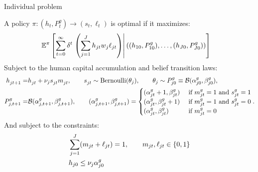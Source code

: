 
\begin{frame}{Individual problem}


A policy $\pi: (h_t, P_t^g) \to (s_t, \ell_t)$ is optimal if it maximizes:
\begin{align*}
& \mathbb{E}^\pi \left[ 
   \sum_{t=0}^\infty \delta^t 
   \left. \left( \sum_{j=1}^J h_{jt} w_j \ell_{jt}  \right) \right\vert
   \left( (h_{10}, P_{10}^g), \dots, (h_{J0}, P_{J0}^g) \right)
 \right] 
\end{align*}
Subject to the human capital accumulation and belief transition laws:
\begin{align*}
    h_{jt+1}^{} =& h_{jt}^{} + \nu_j s_{jt}^{}  m_{jt}^{}, 
    \quad \quad 
    s_{jt}^{} \sim \text{Bernoulli} (\theta_j), 
    \quad \quad
    \theta_{j} \sim P_{j0}^{g} \equiv \mathcal{B} (\alpha_{j0}^g, \beta_{j0}^g),
    \\
    P_{j,t+1}^g =& \mathcal{B} (\alpha_{j,t+1}^g, \beta_{j,t+1}^g), 
    \quad \quad 
    (\alpha_{j,t+1}^{g}, \beta_{j,t+1}^{g}) = 
    \begin{cases} 
        (\alpha_{jt}^g + 1, \beta_{jt}^g) &\text{ if } m_{jt}^g = 1 \text{ and } s_{jt}^g = 1 \\
        (\alpha_{jt}^g, \beta_{jt}^g + 1) &\text{ if } m_{jt}^g = 1 \text{ and } s_{jt}^g = 0 \\
        (\alpha_{jt}^g, \beta_{jt}^g) &\text{ if } m_{jt}^g = 0
    \end{cases}
    .
\end{align*}
And subject to the constraints:
\begin{align*}
&\sum_{j=1}^J (m_{jt} + \ell_{jt}) = 1, \quad \quad m_{jt}, \ell_{jt} \in \{0,1\} \\
&h_{j0} \leq \nu_j \alpha_{j0}^{g}
\end{align*}

\end{frame}

